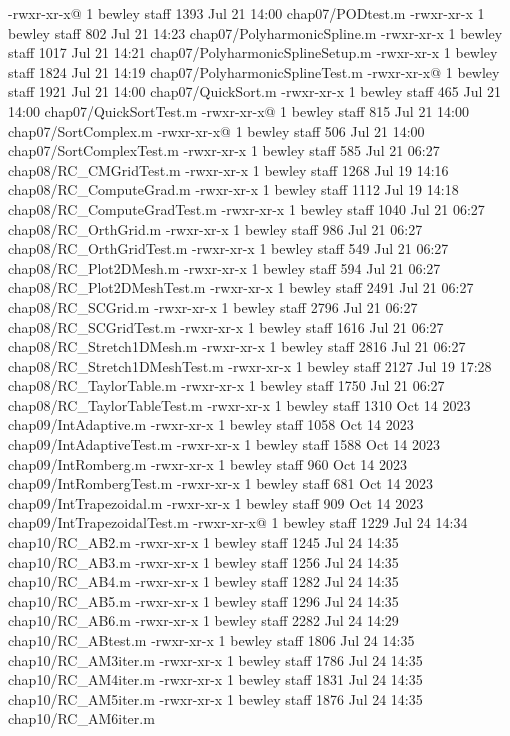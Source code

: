 -rwxr-xr-x@ 1 bewley  staff   1393 Jul 21 14:00 chap07/PODtest.m
-rwxr-xr-x  1 bewley  staff    802 Jul 21 14:23 chap07/PolyharmonicSpline.m
-rwxr-xr-x  1 bewley  staff   1017 Jul 21 14:21 chap07/PolyharmonicSplineSetup.m
-rwxr-xr-x  1 bewley  staff   1824 Jul 21 14:19 chap07/PolyharmonicSplineTest.m
-rwxr-xr-x@ 1 bewley  staff   1921 Jul 21 14:00 chap07/QuickSort.m
-rwxr-xr-x  1 bewley  staff    465 Jul 21 14:00 chap07/QuickSortTest.m
-rwxr-xr-x@ 1 bewley  staff    815 Jul 21 14:00 chap07/SortComplex.m
-rwxr-xr-x@ 1 bewley  staff    506 Jul 21 14:00 chap07/SortComplexTest.m
-rwxr-xr-x  1 bewley  staff    585 Jul 21 06:27 chap08/RC_CMGridTest.m
-rwxr-xr-x  1 bewley  staff   1268 Jul 19 14:16 chap08/RC_ComputeGrad.m
-rwxr-xr-x  1 bewley  staff   1112 Jul 19 14:18 chap08/RC_ComputeGradTest.m
-rwxr-xr-x  1 bewley  staff   1040 Jul 21 06:27 chap08/RC_OrthGrid.m
-rwxr-xr-x  1 bewley  staff    986 Jul 21 06:27 chap08/RC_OrthGridTest.m
-rwxr-xr-x  1 bewley  staff    549 Jul 21 06:27 chap08/RC_Plot2DMesh.m
-rwxr-xr-x  1 bewley  staff    594 Jul 21 06:27 chap08/RC_Plot2DMeshTest.m
-rwxr-xr-x  1 bewley  staff   2491 Jul 21 06:27 chap08/RC_SCGrid.m
-rwxr-xr-x  1 bewley  staff   2796 Jul 21 06:27 chap08/RC_SCGridTest.m
-rwxr-xr-x  1 bewley  staff   1616 Jul 21 06:27 chap08/RC_Stretch1DMesh.m
-rwxr-xr-x  1 bewley  staff   2816 Jul 21 06:27 chap08/RC_Stretch1DMeshTest.m
-rwxr-xr-x  1 bewley  staff   2127 Jul 19 17:28 chap08/RC_TaylorTable.m
-rwxr-xr-x  1 bewley  staff   1750 Jul 21 06:27 chap08/RC_TaylorTableTest.m
-rwxr-xr-x  1 bewley  staff   1310 Oct 14  2023 chap09/IntAdaptive.m
-rwxr-xr-x  1 bewley  staff   1058 Oct 14  2023 chap09/IntAdaptiveTest.m
-rwxr-xr-x  1 bewley  staff   1588 Oct 14  2023 chap09/IntRomberg.m
-rwxr-xr-x  1 bewley  staff    960 Oct 14  2023 chap09/IntRombergTest.m
-rwxr-xr-x  1 bewley  staff    681 Oct 14  2023 chap09/IntTrapezoidal.m
-rwxr-xr-x  1 bewley  staff    909 Oct 14  2023 chap09/IntTrapezoidalTest.m
-rwxr-xr-x@ 1 bewley  staff   1229 Jul 24 14:34 chap10/RC_AB2.m
-rwxr-xr-x  1 bewley  staff   1245 Jul 24 14:35 chap10/RC_AB3.m
-rwxr-xr-x  1 bewley  staff   1256 Jul 24 14:35 chap10/RC_AB4.m
-rwxr-xr-x  1 bewley  staff   1282 Jul 24 14:35 chap10/RC_AB5.m
-rwxr-xr-x  1 bewley  staff   1296 Jul 24 14:35 chap10/RC_AB6.m
-rwxr-xr-x  1 bewley  staff   2282 Jul 24 14:29 chap10/RC_ABtest.m
-rwxr-xr-x  1 bewley  staff   1806 Jul 24 14:35 chap10/RC_AM3iter.m
-rwxr-xr-x  1 bewley  staff   1786 Jul 24 14:35 chap10/RC_AM4iter.m
-rwxr-xr-x  1 bewley  staff   1831 Jul 24 14:35 chap10/RC_AM5iter.m
-rwxr-xr-x  1 bewley  staff   1876 Jul 24 14:35 chap10/RC_AM6iter.m
